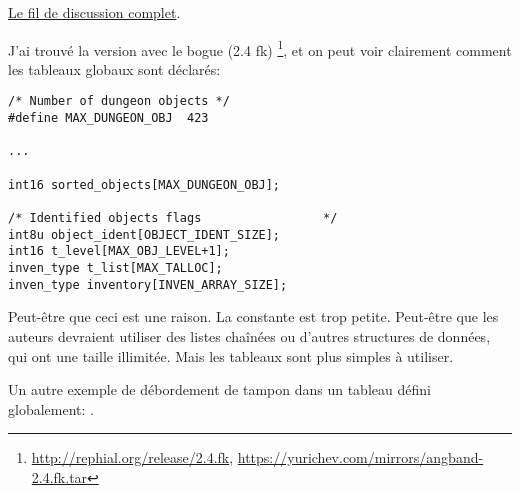 \href{https://groups.google.com/forum/#!search/angband$202.4$20bug$20multiplying$20items/rec.games.moria/jItmfrdGyL8/FoQeiccewHAJ}{Le fil de discussion complet}.

J'ai trouvé la version avec le bogue (2.4 fk)
\footnote{\url{http://rephial.org/release/2.4.fk}, \url{https://yurichev.com/mirrors/angband-2.4.fk.tar}},
et on peut voir clairement comment les tableaux globaux sont déclarés:

\begin{lstlisting}[style=customc]
/* Number of dungeon objects */
#define MAX_DUNGEON_OBJ  423

...

int16 sorted_objects[MAX_DUNGEON_OBJ];

/* Identified objects flags					*/
int8u object_ident[OBJECT_IDENT_SIZE];
int16 t_level[MAX_OBJ_LEVEL+1];
inven_type t_list[MAX_TALLOC];
inven_type inventory[INVEN_ARRAY_SIZE];
\end{lstlisting}

Peut-être que ceci est une raison. La constante  est trop petite.
Peut-être que les auteurs devraient utiliser des listes chaînées ou d'autres structures
de données, qui ont une taille illimitée.
Mais les tableaux sont plus simples à utiliser.

Un autre exemple de débordement de tampon dans un tableau défini globalement: .

